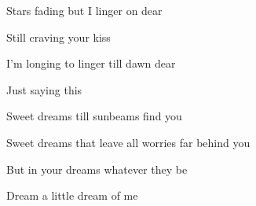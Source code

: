 \begin{song}
\bigskip

 Stars fading but I linger on dear \par
{} Still craving your kiss  \par
{} I'm longing to linger till dawn dear \par
{} Just saying this  \par

\bigskip

 Sweet dreams till sunbeams  find you \par
{} Sweet dreams that leave all worries far behind you \par
{} But in your dreams whatever they be \par
{}Dream a little dream of me \par

\end{song}
